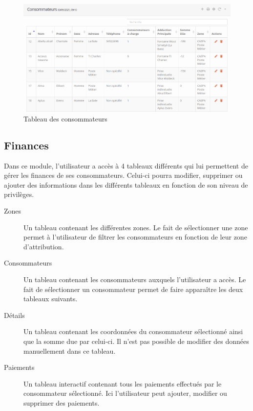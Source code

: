 \documentclass{EPL-master-thesis-covers-FR}
\begin{document}
				\begin{figure}[H]
					\centering
					\includegraphics[width=1\textwidth]{images/consumer_tab1}
					\caption{Tableau des consommateurs}
				\end{figure}
			
\newpage
			\subsection{Finances}
				Dans ce module, l'utilisateur a accès à 4 tableaux différents qui lui permettent de gérer les finances de ses consommateurs. Celui-ci pourra modifier, supprimer ou ajouter des informations dans les différents tableaux en fonction de son niveau de privilèges.
				\begin{description}
					\item[Zones] Un tableau contenant les différentes zones. Le fait de sélectionner une zone permet à l'utilisateur de filtrer les consommateurs en fonction de leur zone d'attribution.
					\item[Consommateurs] Un tableau contenant les consommateurs auxquels l'utilisateur a accès. Le fait de sélectionner un consommateur permet de faire apparaître les deux tableaux suivants.
					\item[Détails] Un tableau contenant les coordonnées du consommateur sélectionné ainsi que la somme due par celui-ci. Il n'est pas possible de modifier des données manuellement dans ce tableau.
					\item[Paiements] Un tableau interactif contenant tous les paiements effectués par le consommateur sélectionné. Ici l'utilisateur peut ajouter, modifier ou supprimer des paiements.
				\end{description}
				
\end{document}
